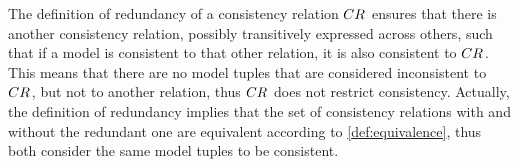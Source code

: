 \begin{definition}
\end{definition}

The definition of redundancy of a consistency relation $\consistencyrelation{CR}{}$ ensures that there is another consistency relation, possibly transitively expressed across others, such that if a model is consistent to that other relation, it is also consistent to $\consistencyrelation{CR}{}$.
This means that there are no model tuples that are considered inconsistent to $\consistencyrelation{CR}{}$, but not to another relation, thus $\consistencyrelation{CR}{}$ does not restrict consistency.
Actually, the definition of redundancy implies that the set of consistency relations with and without the redundant one are equivalent according to \autoref{def:equivalence}, thus both consider the same model tuples to be consistent.

